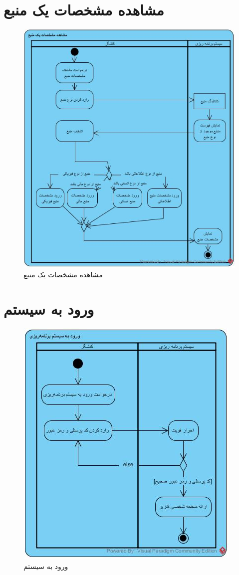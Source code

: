 \section{مشاهده مشخصات یک منبع}
\begin{figure}[H]
	\centering
	\includegraphics[scale=0.8]{img/activity/ViewResourceAttributes}
	\caption{مشاهده مشخصات یک منبع}
\end{figure}

\section{ورود به سیستم}
\begin{figure}[H]
	\centering
	\includegraphics[scale=1]{img/activity/SignIn}
	\caption{ورود به سیستم}
\end{figure}


